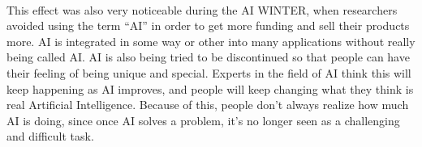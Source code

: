 \documentclass{article}
\begin{document}
\paragraph{}
	This effect was also very noticeable during the AI WINTER, when researchers avoided using the term “AI” in order to get more funding and sell their products more. 
	AI is integrated in some way or other into many applications without really being called AI.
	AI is also being tried to be discontinued so that people can have their feeling of being unique and special. 
	Experts in the field of AI think this will keep happening as AI improves, and people will keep changing what they think is real Artificial Intelligence. 
	Because of this, people don’t always realize how much AI is doing, since once AI solves a problem, it’s no longer seen as a challenging and difficult task.




  
\end{document}
